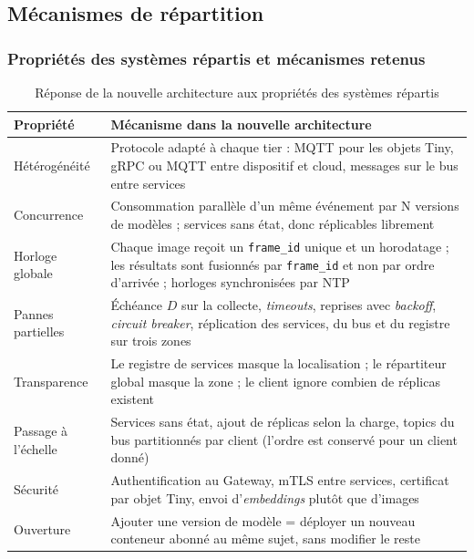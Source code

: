 \documentclass[11pt,a4paper]{article}
\begin{document}
\subsection{Mécanismes de répartition}

\subsubsection{Propriétés des systèmes répartis et mécanismes retenus}

\begin{table}[h]
\centering
\begin{tabular}{|p{3.0cm}|p{11.6cm}|}
\hline
\textbf{Propriété} & \textbf{Mécanisme dans la nouvelle architecture} \\
\hline
Hétérogénéité & Protocole adapté à chaque tier : MQTT pour les objets Tiny, gRPC ou MQTT entre dispositif et cloud, messages sur le bus entre services \\
\hline
Concurrence & Consommation parallèle d'un même événement par N versions de modèles ; services sans état, donc réplicables librement \\
\hline
Horloge globale & Chaque image reçoit un \texttt{frame\_id} unique et un horodatage ; les résultats sont fusionnés par \texttt{frame\_id} et non par ordre d'arrivée ; horloges synchronisées par NTP \\
\hline
Pannes partielles & Échéance $D$ sur la collecte, \textit{timeouts}, reprises avec \textit{backoff}, \textit{circuit breaker}, réplication des services, du bus et du registre sur trois zones \\
\hline
Transparence & Le registre de services masque la localisation ; le répartiteur global masque la zone ; le client ignore combien de réplicas existent \\
\hline
Passage à l'échelle & Services sans état, ajout de réplicas selon la charge, topics du bus partitionnés par client (l'ordre est conservé pour un client donné) \\
\hline
Sécurité & Authentification au Gateway, mTLS entre services, certificat par objet Tiny, envoi d'\textit{embeddings} plutôt que d'images \\
\hline
Ouverture & Ajouter une version de modèle = déployer un nouveau conteneur abonné au même sujet, sans modifier le reste \\
\hline
\end{tabular}
\caption{Réponse de la nouvelle architecture aux propriétés des systèmes répartis}
\end{table}
\end{document}
